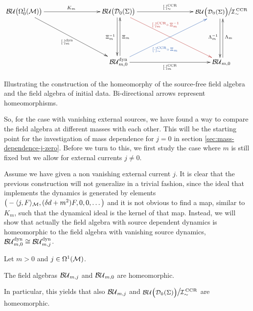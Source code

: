 \begin{table}[]
\begin{displaymath}
\xymatrix @R=20mm @C=30mm
{
	\BUOmega  \ar[r]^{K_m} \ar[dr]_{[\cdot]_m^{\text{dyn}}} 	& \BU\big(\Dzs \big) \ar[r]^{[\cdot]^\text{CCR}_{\sim}}\ar@[linkred][dr]^(.35){  \color{linkred}{\;\;\;[\cdot]^\text{CCR}_m \comp \, \Xi_m^{-1}}  } \ar@<-.5ex>[d]_{\Xi^{-1}_m}  		&       {{\Quotientscale{\BU\big( \Dzs\big) }{\ICCR}}} \ar@<-.5ex>[d]_{\Lambda_m^{-1}} \\
	&  \BUmzdyn  		\ar[r]_{[\cdot]^\text{CCR}_{m}} \ar@[linkblue][ur]_(.35){  \color{linkblue}{\;\;\;[\cdot]^\text{CCR}_\sim \comp \, \Xi_m} } 	                                     \ar@<-.5ex>[u]_{\Xi_m}		& 		 \BUmz	\ar@<-.5ex>[u]_{\Lambda_m}\\
}
\end{displaymath}
\caption{Illustrating the construction of the homeomorphy of the source-free field algebra and the field algebra of initial data. Bi-directional arrows represent homeomorphisms.}
\label{dia:source-free-homeomorphism-final}
\end{table}
%
So, for the case with vanishing external sources, we have found a way to compare the field algebra at different masses with each other. This will be the starting point for the investigation of mass dependence for $j=0$ in section \ref{sec:mass-dependence-j-zero}. Before we turn to this, we first study the case where $m$ is still fixed but we allow for external currents $j \neq 0$.\par
Assume we have given a non vanishing external current $j$. It is clear that the previous construction will not generalize in a trivial fashion, since the ideal that implements the dynamics is generated by elements $\big(-\langle j, F \rangle_{\mathcal{M}}, (\delta d + m^2)F,0,0,\dots\big)$ and it is not obvious to find a map, similar to $K_m$, such that the dynamical ideal is the kernel of that map. Instead, we will show that actually the field algebra with source dependent dynamics is homeomorphic to the field algebra with vanishing source dynamics, $\mathcal{BU}_{m,0}^\text{dyn} \cong \mathcal{BU}_{m,j}^\text{dyn}$.
\begin{theorem}\label{thm:field-algebra-homeomorphy}
	Let $m > 0$ and $j \in \Omega^1(\mathcal{M})$.
	\begin{center}
	The field algebras ${\mathcal{BU}_{m,j}}$ and $\mathcal{BU}_{m,0}$ are homeomorphic.
	\end{center}
	In particular, this yields that also ${\mathcal{BU}_{m,j}}$ and ${\Quotientscale{\BU\big(\Dzs\big)}{\ICCR}}$ are homeomorphic.
\end{theorem}
